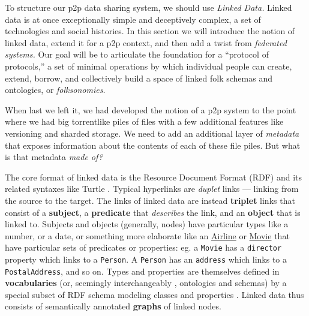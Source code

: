 To structure our p2p data sharing system, we should use \emph{Linked
Data.} Linked data is at once exceptionally simple and deceptively
complex, a set of technologies and social histories. In this section we
will introduce the notion of linked data, extend it for a p2p context,
and then add a twist from \emph{federated systems.} Our goal will be to articulate the foundation for a
``protocol of protocols,'' a set of minimal operations by which
individual people can create, extend, borrow, and collectively build a
space of linked folk schemas and ontologies, or \emph{folksonomies.}

When last we left it, we had developed the notion of a p2p system to the
point where we had big torrentlike piles of files with a few additional
features like versioning and sharded storage. We need to add an
additional layer of \emph{metadata} that exposes information about the
contents of each of these file piles. But what is that metadata
\emph{made of?}

The core format of linked data is the Resource Document Format (RDF)
\citep{klyneRDFConceptsAbstract2014}  and its related syntaxes
like Turtle \citep{beckettRDFTurtle2014} . Typical hyperlinks are
\emph{duplet} links --- linking from the source to the target. The links
of linked data are instead \textbf{triplet} links that consist of a
\textbf{subject}, a \textbf{predicate} that \emph{describes} the link,
and an \textbf{object} that is linked to. Subjects and objects
(generally, nodes) have particular types like a number, or a date, or
something more elaborate like an
\href{https://schema.org/Airline}{Airline} or
\href{https://schema.org/Movie}{Movie} that have particular sets of
predicates or properties: eg. a \texttt{Movie} has a \texttt{director}
property which links to a \texttt{Person}. A \texttt{Person} has an
\texttt{address} which links to a \texttt{PostalAddress}, and so on.
Types and properties are themselves defined in \textbf{vocabularies}
(or, seemingly interchangeably \citep{w3cOntologiesW3C} ,
ontologies and schemas) by a special subset of RDF schema modeling
classes and properties \citep{brickleyRDFSchema2014} . Linked data
thus consists of semantically annotated \textbf{graphs} of linked
nodes.

